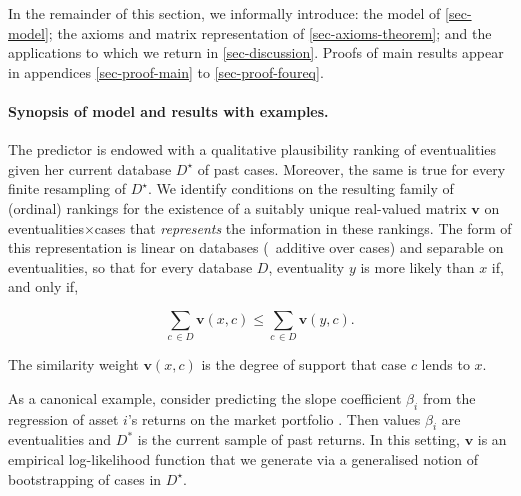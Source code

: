 \documentclass[12pt,a4paper,twoside]{article}
\begin{document}
In the remainder of this section, we informally introduce: the model of
\cref{sec-model}; the axioms and matrix representation of
\cref{sec-axioms-theorem}; and the applications to which we return in
\cref{sec-discussion}. Proofs of main results appear in appendices
\ref{sec-proof-main} to \ref{sec-proof-foureq}.


\paragraph{Synopsis of model and results with examples.} The predictor is endowed with a
qualitative plausibility ranking of eventualities given her current database
$D^{\star}$ of past cases. Moreover, the same is true for every finite
resampling of $D^{\star}$. We identify conditions on the resulting family of
(ordinal) rankings for the existence of a suitably unique
real-valued matrix $\mathbf v$ on eventualities$\times$cases that \emph{represents} the
information in these rankings. The form of this representation is linear on
databases (\ie\ additive over cases) and separable on eventualities, so that for
every database $D$, eventuality $y$ is
more likely than $x$ if, and only if,
\begin{linenomath*}
  \begin{equation}\label{eq-similarity}
  \sum_{c\,\in D} \mathbf  v(x,c) \leq \sum_{c\,\in D} \mathbf v(y,c).
\end{equation}
\end{linenomath*}
The similarity weight $\mathbf{v}(x,c)$ is the degree of support that case $c$
lends to $x$.
\begin{example}As a canonical example, consider predicting the slope coefficient
  $\beta_{i}$ from the regression of asset $i$'s returns on the market portfolio
  \citep[in the two-pass method of][]{FM-Two_pass}. Then values $\beta_{i}$ are
  eventualities and $D^{*}$ is the current sample of past returns. In this
  setting, $\mathbf v$ is an empirical log-likelihood function that we generate
  via a generalised notion of bootstrapping of cases in $D^{\star}$.
\end{example}
\end{document}
